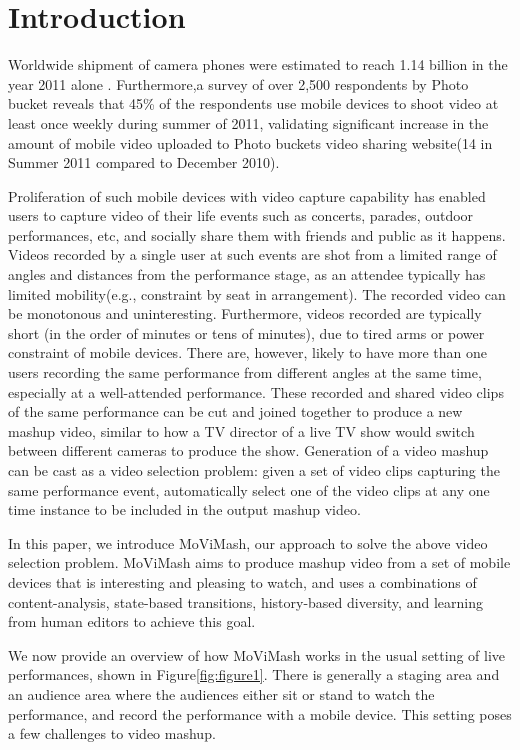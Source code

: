 \documentclass{sig-alternate}
\begin{document}
\section{Introduction}
Worldwide shipment of camera phones were estimated to reach 1.14 billion in the year 2011 alone \cite{arnolʹd2012geometrical}.
Furthermore,a survey of over 2,500 respondents by Photo bucket reveals that 45\% of the respondents use mobile devices to shoot video at least once weekly during summer of 2011, validating significant increase in the amount of mobile video uploaded to Photo buckets video sharing website(14 in Summer 2011 compared to December 2010)\cite{arnolʹd2012geometrical}.

 Proliferation of such mobile devices with video capture capability has enabled users to capture video of their life events such as concerts, parades, outdoor performances, etc, and socially share them with friends and public as it happens. Videos recorded by a single user at such events are shot from a limited range of angles and distances from the performance stage, as an attendee typically has limited mobility(e.g., constraint by seat in arrangement). The recorded video can be monotonous and uninteresting. Furthermore, videos recorded are typically short (in the order of minutes or tens of minutes), due to tired arms or power constraint of mobile devices. There are, however, likely to have more than one users recording the same performance from different angles at the same time, especially at a well-attended performance. These recorded and shared video clips of the same performance can be cut and joined together to produce a new mashup video, similar to how a TV director of a live TV show would switch between different cameras to produce the show. Generation of a video mashup can be cast as a video selection problem: given a set of video clips capturing the same performance event, automatically select one of the video clips at any one time instance to be included in the output mashup video.

 In this paper, we introduce MoViMash, our approach to solve the above video selection problem. MoViMash aims to produce mashup video from a set of mobile devices that is interesting and pleasing to watch, and uses a combinations of content-analysis, state-based transitions, history-based diversity, and learning from human editors to achieve this goal.

 We now provide an overview of how MoViMash works in the usual setting of live performances, shown in Figure\ref{fig:figure1}. There is generally a staging area and an audience area where the audiences either sit or stand to watch the performance, and record the performance with a mobile device. This setting poses a few challenges to video mashup.
 
\end{document}

